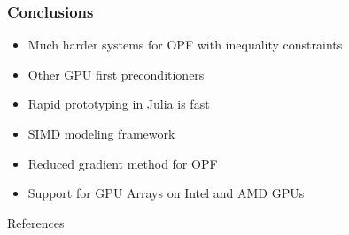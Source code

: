 \begin{frame}
  \frametitle{Conclusions}
  \begin{itemize}
    \item Much harder systems for OPF with inequality constraints
    \item Other GPU first preconditioners
    \item Rapid prototyping in Julia is fast
    \item SIMD modeling framework
    \item Reduced gradient method for OPF
    \item Support for GPU Arrays on Intel and AMD GPUs
  \end{itemize}
\end{frame}

\begin{frame}{References}
    \printbibliography[heading=none]
\end{frame}



